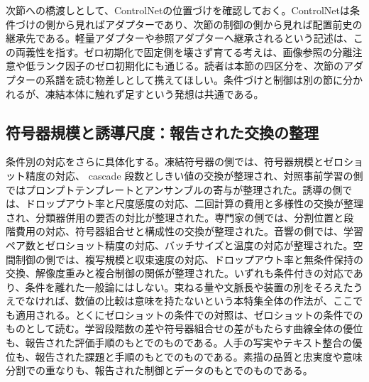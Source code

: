 \documentclass[lualatex,a4paper,10pt]{jlreq}
\begin{document}
次節への橋渡しとして、ControlNetの位置づけを確認しておく。ControlNetは条件づけの側から見ればアダプターであり、次節の制御の側から見れば配置前史の継承先である\autocite{btd036}。軽量アダプターや参照アダプターへ継承されるという記述は、この両義性を指す。ゼロ初期化で固定側を壊さず育てる考えは、画像参照の分離注意や低ランク因子のゼロ初期化にも通じる。読者は本節の四区分を、次節のアダプターの系譜を読む物差しとして携えてほしい。条件づけと制御は別の節に分かれるが、凍結本体に触れず足すという発想は共通である。

\subsection{符号器規模と誘導尺度：報告された交換の整理}
条件別の対応をさらに具体化する。凍結符号器の側では、符号器規模とゼロショット精度の対応、 cascade 段数としきい値の交換が整理され、対照事前学習の側ではプロンプトテンプレートとアンサンブルの寄与が整理された\autocite{btd011,btd031}。誘導の側では、ドロップアウト率と尺度感度の対応、二回計算の費用と多様性の交換が整理され、分類器併用の要否の対比が整理された\autocite{btd032,btd033}。専門家の側では、分割位置と段階費用の対応、符号器組合せと構成性の交換が整理された\autocite{btd034}。音響の側では、学習ペア数とゼロショット精度の対応、バッチサイズと温度の対応が整理された\autocite{btd035}。空間制御の側では、複写規模と収束速度の対応、ドロップアウト率と無条件保持の交換、解像度重みと複合制御の関係が整理された\autocite{btd036}。いずれも条件付きの対応であり、条件を離れた一般論にはしない。束ねる量や文脈長や装置の別をそろえたうえでなければ、数値の比較は意味を持たないという本特集全体の作法が、ここでも適用される。とくにゼロショットの条件での対照は、ゼロショットの条件でのものとして読む。学習段階数の差や符号器組合せの差がもたらす曲線全体の優位も、報告された評価手順のもとでのものである\autocite{btd034}。人手の写実やテキスト整合の優位も、報告された課題と手順のもとでのものである\autocite{btd032,btd033}。素描の品質と忠実度や意味分割での重なりも、報告された制御とデータのもとでのものである\autocite{btd036}。
\end{document}
